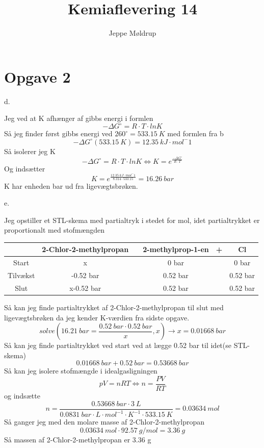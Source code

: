 \documentclass[12pt]{article}
\title{Kemiaflevering 14}
\author{Jeppe Møldrup}
\date{}
\begin{document}
\maketitle{}

\section*{Opgave 2}

d.

Jeg ved at K afhænger af gibbs energi i formlen
$$-\Delta G^{\circ} = R\cdot T\cdot ln K$$
Så jeg finder først gibbs energi ved $260^{\circ} = 533.15\ K$ med formlen fra b
$$-\Delta G^{\circ}(533.15\ K) = 12.35\ kJ\cdot mol^-1$$
Så isolerer jeg K
$$-\Delta G^{\circ} = R\cdot T\cdot ln K \Leftrightarrow K = e^{\frac{-\Delta G^{\circ}}{R\cdot T}}$$
Og indsætter
$$K = e^{\frac{12.35\ kJ\cdot mol^-1}{8.314\cdot 533.15}} = 16.26\ bar$$
K har enheden bar ud fra ligevægtsbrøken.

e.

Jeg opstiller et STL-skema med partialtryk i stedet for mol, idet
partialtrykket er proportionalt med stofmængden

\begin{center}
        \begin{tabular}{| c | c | c | c | c | c |}
                \hline
                & 2-Chlor-2-methylpropan & \ce{<=>} & 2-methylprop-1-en & + & Cl \\ \hline
                Start & x & & 0 bar & & 0 bar \\ \hline
                Tilvækst & -0.52 bar & & 0.52 bar & & 0.52 bar \\ \hline
                Slut & x-0.52 bar & & 0.52 bar & & 0.52 bar \\ \hline
        \end{tabular}
\end{center}

Så kan jeg finde partialtrykket af 2-Chlor-2-methylpropan til slut med ligevægtsbrøken
da jeg kender K-værdien fra sidste opgave.
$$solve(16.21\ bar=\frac{0.52\ bar \cdot 0.52\ bar}{x},x) \rightarrow x = 0.01668\ bar$$
Så kan jeg finde partialtrykket ved start ved at lægge 0.52 bar til idet(se STL-skema)
$$0.01668\ bar + 0.52\ bar = 0.53668\ bar$$
Så kan jeg isolere stofmængde i idealgasligningen
$$pV = nRT \Leftrightarrow n = \frac{PV}{RT}$$
og indsætte
$$n = \frac{0.53668\ bar \cdot 3\ L}{0.0831\ bar\cdot L \cdot mol^{-1}\cdot K^{-1}\cdot 533.15\ K} = 0.03634\ mol$$
Så ganger jeg med den molare masse af 2-Chlor-2-methylpropan
$$0.03634\ mol \cdot 92.57\ g/mol = 3.36\ g$$
Så massen af 2-Chlor-2-methylpropan er 3.36 g
\end{document}
